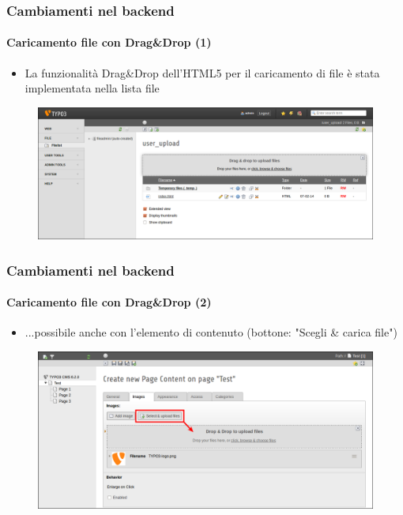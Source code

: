 
\begin{frame}[fragile]
	\frametitle{Cambiamenti nel backend}
	\framesubtitle{Caricamento file con Drag\&Drop (1)}

	\begin{itemize}
		\item La funzionalità Drag\&Drop dell'HTML5 per il caricamento di file è stata implementata nella lista file

	\end{itemize}

	\begin{figure}
		\includegraphics[width=0.95\linewidth]{Images/BackendChanges/DragDropFileUpload.png}
	\end{figure}

\end{frame}


\begin{frame}[fragile]
	\frametitle{Cambiamenti nel backend}
	\framesubtitle{Caricamento file con Drag\&Drop (2)}

	\begin{itemize}
		\item ...possibile anche con l'elemento di contenuto (bottone: "Scegli \& carica file")

	\end{itemize}

	\begin{figure}
		\includegraphics[width=0.95\linewidth]{Images/BackendChanges/SelectAndUploadFiles.png}
	\end{figure}

\end{frame}

